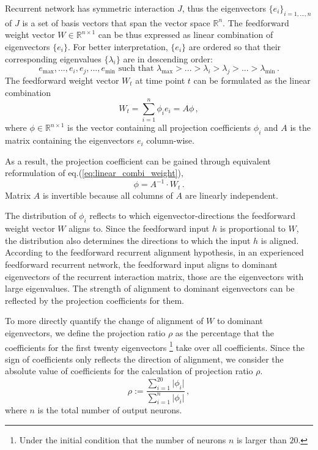 \documentclass[11pt]{article}
\begin{document}
	Recurrent network has symmetric interaction $J$, thus the eigenvectors $\{e_i\}_{i = 1, ..., n}$ of $J$ is a set of basis vectors that span the vector space $\mathbb{R}^n$. The feedforward weight vector $W \in \mathbb{R}^{n \times 1}$ can be thus expressed as linear combination of eigenvectors $\{e_i\}$. For better interpretation, $\{e_i\}$ are ordered so that their corresponding eigenvalues $\{\lambda_i\}$ are in descending order:
		\begin{equation}
			e_{\text{max}}, ..., e_i, e_j, ..., e_{\text{min}} \, \, \text{such that} \, \, \lambda_{\text{max}} > ...> \lambda_i > \lambda_j > ... > \lambda_{\text{min}} \, .
		\end{equation} 
	The feedforward weight vector $W_t$ at time point $t$ can be formulated as the linear combination
		\begin{equation} \label{eq:linear_combi_weight}
			W_t = \sum_{i = 1}^{n} \phi_i e_i = A \phi \, ,
		\end{equation}
	where $\phi \in \mathbb{R}^{n \times 1}$ is the vector containing all projection coefficients $\phi_i$ and $A$ is the matrix containing the eigenvectors $e_i$ column-wise.  
	
	As a result, the projection coefficient can be gained through equivalent reformulation of eq.(\ref{eq:linear_combi_weight}), 
		\begin{equation} \label{eq:calculation_ratio}
			\phi = A^{-1} \cdot W_t \, .
		\end{equation}
	Matrix $A$ is invertible because all columns of $A$ are linearly independent. 
	
	The distribution of $\phi_i$ reflects to which eigenvector-directions the feedforward weight vector $W$ aligns to. Since the feedforward input $h$ is proportional to $W$, the distribution also determines the directions to which the input $h$ is aligned.  According to the feedforward recurrent alignment hypothesis, in an experienced feedforward recurrent network, the feedforward input aligns to dominant eigenvectors of the recurrent interaction matrix, those are the eigenvectors with large eigenvalues. The strength of alignment to dominant eigenvectors can be reflected by the projection coefficients for them. 
	
	To more directly quantify the change of alignment of $W$ to dominant eigenvectors, we define the projection ratio $\rho$ as the percentage that the coefficients for the first twenty eigenvectors \footnote{Under the initial condition that the number of neurons $n$ is larger than $20$.} take over all coefficients. Since the sign of coefficients only reflects the direction of alignment, we consider the absolute value of coefficients for the calculation of projection ratio $\rho$.
		\begin{equation} \label{eq:projection_ratio}
			\rho := \frac{\sum_{i=1}^{20} \vert \phi_i \vert}{\sum_{i=1}^{n} \vert \phi_i \vert} \, ,
		\end{equation}
	where $n$ is the total number of output neurons. 
		
\end{document}
